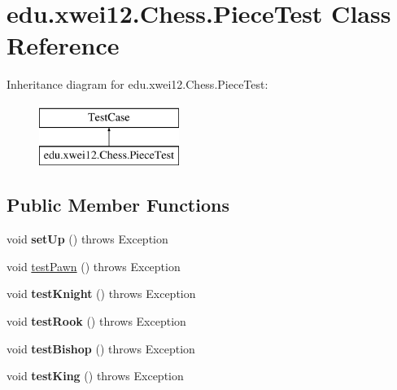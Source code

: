 \hypertarget{classedu_1_1xwei12_1_1_chess_1_1_piece_test}{}\section{edu.\+xwei12.\+Chess.\+Piece\+Test Class Reference}
\label{classedu_1_1xwei12_1_1_chess_1_1_piece_test}
Inheritance diagram for edu.\+xwei12.\+Chess.\+Piece\+Test\+:\begin{figure}[H]
\begin{center}
\leavevmode
\includegraphics[height=2.000000cm]{classedu_1_1xwei12_1_1_chess_1_1_piece_test}
\end{center}
\end{figure}
\subsection*{Public Member Functions}
\begin{DoxyCompactItemize}
\item 
void {\bfseries set\+Up} ()  throws Exception \hypertarget{classedu_1_1xwei12_1_1_chess_1_1_piece_test_a8d563847ce37b17c4c80b752c29a1449}{}\label{classedu_1_1xwei12_1_1_chess_1_1_piece_test_a8d563847ce37b17c4c80b752c29a1449}

\item 
void \hyperlink{classedu_1_1xwei12_1_1_chess_1_1_piece_test_afbaacc23807740710a9cf3f4c7ac3937}{test\+Pawn} ()  throws Exception 
\item 
void {\bfseries test\+Knight} ()  throws Exception \hypertarget{classedu_1_1xwei12_1_1_chess_1_1_piece_test_a353d927cb68de6b97e45cd99451e4b9a}{}\label{classedu_1_1xwei12_1_1_chess_1_1_piece_test_a353d927cb68de6b97e45cd99451e4b9a}

\item 
void {\bfseries test\+Rook} ()  throws Exception \hypertarget{classedu_1_1xwei12_1_1_chess_1_1_piece_test_aab7f8d704b7dc04c7101f34f089688b1}{}\label{classedu_1_1xwei12_1_1_chess_1_1_piece_test_aab7f8d704b7dc04c7101f34f089688b1}

\item 
void {\bfseries test\+Bishop} ()  throws Exception \hypertarget{classedu_1_1xwei12_1_1_chess_1_1_piece_test_a8657ed3c0a10addc0239f5e540282d34}{}\label{classedu_1_1xwei12_1_1_chess_1_1_piece_test_a8657ed3c0a10addc0239f5e540282d34}

\item 
void {\bfseries test\+King} ()  throws Exception \hypertarget{classedu_1_1xwei12_1_1_chess_1_1_piece_test_a5f4fb7ddb8c16a9cafdce1eb0f1b0197}{}\label{classedu_1_1xwei12_1_1_chess_1_1_piece_test_a5f4fb7ddb8c16a9cafdce1eb0f1b0197}

\end{DoxyCompactItemize}


